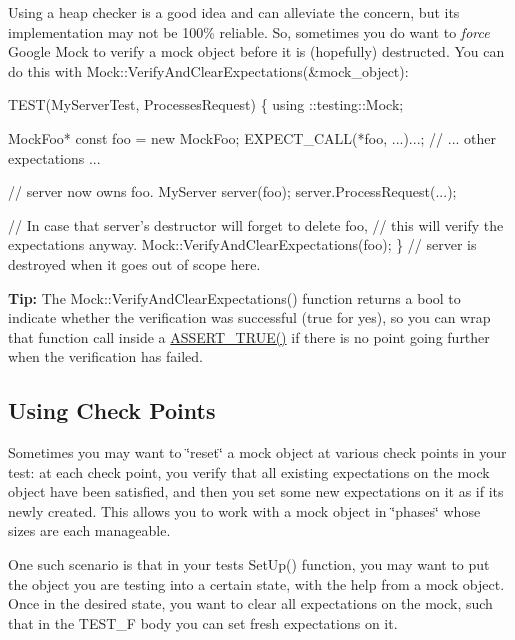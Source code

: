 Using a heap checker is a good idea and can alleviate the concern, but its implementation may not be 100\% reliable. So, sometimes you do want to {\itshape force} Google Mock to verify a mock object before it is (hopefully) destructed. You can do this with {\ttfamily Mock\+::\+Verify\+And\+Clear\+Expectations(\&mock\+\_\+object)}\+:


\begin{DoxyCode}
TEST(MyServerTest, ProcessesRequest) \{
  using ::testing::Mock;

  MockFoo* const foo = new MockFoo;
  EXPECT\_CALL(*foo, ...)...;
  // ... other expectations ...

  // server now owns foo.
  MyServer server(foo);
  server.ProcessRequest(...);

  // In case that server's destructor will forget to delete foo,
  // this will verify the expectations anyway.
  Mock::VerifyAndClearExpectations(foo);
\}  // server is destroyed when it goes out of scope here.
\end{DoxyCode}


{\bfseries Tip\+:} The {\ttfamily Mock\+::\+Verify\+And\+Clear\+Expectations()} function returns a {\ttfamily bool} to indicate whether the verification was successful ({\ttfamily true} for yes), so you can wrap that function call inside a {\ttfamily \hyperlink{gtest_8h_ae9244bfbda562e8b798789b001993fa5}{A\+S\+S\+E\+R\+T\+\_\+\+T\+R\+U\+E()}} if there is no point going further when the verification has failed.

\subsection*{Using Check Points}

Sometimes you may want to \char`\"{}reset\char`\"{} a mock object at various check points in your test\+: at each check point, you verify that all existing expectations on the mock object have been satisfied, and then you set some new expectations on it as if it\textquotesingle{}s newly created. This allows you to work with a mock object in \char`\"{}phases\char`\"{} whose sizes are each manageable.

One such scenario is that in your test\textquotesingle{}s {\ttfamily Set\+Up()} function, you may want to put the object you are testing into a certain state, with the help from a mock object. Once in the desired state, you want to clear all expectations on the mock, such that in the {\ttfamily T\+E\+S\+T\+\_\+F} body you can set fresh expectations on it.

